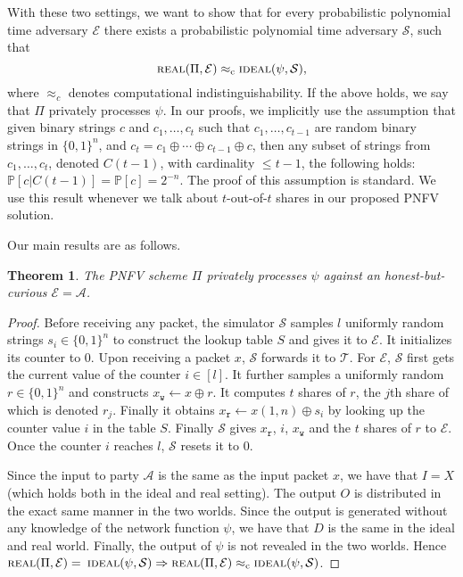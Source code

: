 \RequirePackage{fix-cm} \let\oldvec\vec \documentclass{sig-alternate-05-2015}
\newtheorem{theorem}{Theorem}
\begin{document}
With these two settings, we want to show that for every probabilistic polynomial time adversary $\mathcal{E}$ there exists a probabilistic polynomial time adversary $\mathcal{S}$, such that 
\[
\textsc{real}(\Pi, \mathcal{E})	 \approx_{\text{c}} \textsc{ideal}(\psi, \mathcal{S}),
\]
where $\approx_c$ denotes computational indistinguishability. If the above holds, we say that $\Pi$ privately processes $\psi$. In our proofs, we implicitly use the assumption that given binary strings $c$ and $c_1, \ldots, c_t$ such that $c_1, \ldots, c_{t-1}$ are random binary strings in $\{0, 1\}^n$, and $c_t = c_1 \oplus \cdots \oplus c_{t - 1} \oplus c$, then any subset of strings from $c_1, \ldots, c_t$, denoted $C(t-1)$, with cardinality $\le t - 1$, the following holds: $\mathbb{P}[c | C(t-1)] = \mathbb{P}[c] = 2^{-n}$. The proof of this assumption is standard. We use this result whenever we talk about $t$-out-of-$t$ shares in our proposed PNFV solution.

Our main results are as follows.
\begin{theorem}
The PNFV scheme $\Pi$ privately processes $\psi$ against an honest-but-curious $\mathcal{E} = \mathcal{A}$.
\end{theorem}
\begin{proof}
Before receiving any packet, the simulator $\mathcal{S}$ samples $l$ uniformly random strings $s_i \in \{0, 1\}^n$ to construct the lookup table $S$ and gives it to $\mathcal{E}$. It initializes its counter to $0$. Upon receiving a packet $x$, $\mathcal{S}$ forwards it to $\mathcal{T}$. For $\mathcal{E}$, $\mathcal{S}$ first gets the current value of the counter $i \in [l]$. It further samples a uniformly random $r \in \{0, 1\}^n$ and constructs $x_{\mathtt{w}} \leftarrow x \oplus r$. It computes $t$ shares of $r$, the $j$th share of which is denoted $r_j$. Finally it obtains $x_\mathtt{r} \leftarrow x(1, n) \oplus s_i$ by looking up the counter value $i$ in the table $S$. Finally $\mathcal{S}$ gives $x_{\mathtt{r}}$, $i$, $x_{\mathtt{w}}$ and the $t$ shares of $r$ to $\mathcal{E}$. Once the counter $i$ reaches $l$, $\mathcal{S}$ resets it to $0$. 

Since the input to party $\mathcal{A}$ is the same as the input packet $x$, we have that $I = X$ (which holds both in the ideal and real setting). The output $O$ is distributed in the exact same manner in the two worlds. Since the output is generated without any knowledge of the network function $\psi$, we have that $D$ is the same in the ideal and real world. Finally, the output of $\psi$ is not revealed in the two worlds. Hence 
$\textsc{real}(\Pi, \mathcal{E}) =\vspace{-0.1cm}$ $\textsc{ideal}(\psi, \mathcal{S}) \Rightarrow \textsc{real}(\Pi, \mathcal{E})	 \approx_{\text{c}} \textsc{ideal}(\psi, \mathcal{S})$. 
\end{proof}
\end{document}
